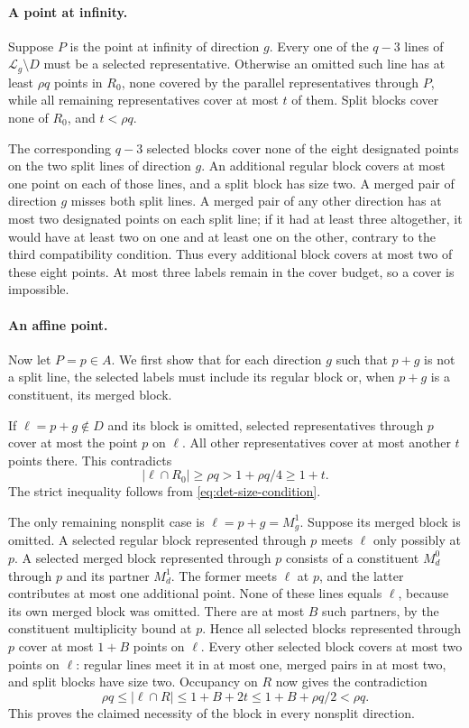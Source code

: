 \paragraph{A point at infinity.}
Suppose $P$ is the point at infinity of direction $g$.  Every one of the
$q-3$ lines of $\mathcal L_g\setminus D$ must be a selected
representative.  Otherwise an omitted such line has at least $\rho q$
points in $R_0$, none covered by the parallel representatives through
$P$, while all remaining representatives cover at most $t$ of them.
Split blocks cover none of $R_0$, and $t<\rho q$.

The corresponding $q-3$ selected blocks cover none of the eight
designated points on the two split lines of direction $g$.  An additional
regular block covers at most one point on each of those lines, and a
split block has size two.  A merged pair of direction $g$ misses both
split lines.  A merged pair of any other direction has at most two
designated points on each split line; if it had at least three altogether,
it would have at least two on one and at least one on the other, contrary
to the third compatibility condition.  Thus every additional block
covers at most two of these eight points.  At most three labels remain
in the cover budget, so a cover is impossible.

\paragraph{An affine point.}
Now let $P=p\in A$.  We first show that for each direction $g$ such that
$p+g$ is not a split line, the selected labels must include its regular
block or, when $p+g$ is a constituent, its merged block.

If $\ell=p+g\notin D$ and its block is omitted, selected
representatives through $p$ cover at most the point $p$ on $\ell$.  All other
representatives cover at most another $t$ points there.  This contradicts
\[
 |\ell\cap R_0|\geq\rho q>1+\rho q/4\geq1+t.
\]
The strict inequality follows from \eqref{eq:det-size-condition}.

The only remaining nonsplit case is $\ell=p+g=M_g^1$.  Suppose its
merged block is omitted.  A selected regular block represented through
$p$ meets $\ell$ only possibly at $p$.  A selected merged block represented
through $p$ consists of a constituent $M_d^0$ through $p$ and its partner
$M_d^1$.  The former meets $\ell$ at $p$, and the latter contributes at
most one additional point.  None of these lines equals $\ell$, because
its own merged block was omitted.  There are at most $B$ such partners,
by the constituent multiplicity bound at $p$.  Hence all selected blocks
represented through $p$ cover at most $1+B$ points on $\ell$.  Every
other selected block covers at most two points on $\ell$: regular lines
meet it in at most one, merged pairs in at most two, and split blocks
have size two.  Occupancy on $R$ now gives the contradiction
\[
 \rho q\leq|\ell\cap R|
 \leq1+B+2t
 \leq1+B+\rho q/2
 <\rho q.
\]
This proves the claimed necessity of the block in every nonsplit
direction.


